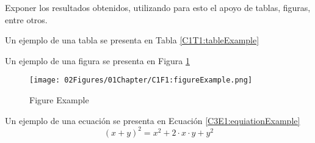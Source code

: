 Exponer los resultados obtenidos, utilizando para esto el apoyo de tablas, figuras, entre otros.

Un ejemplo de una tabla se presenta en Tabla \ref{C1T1:tableExample}


Un ejemplo de una figura se presenta en Figura \ref{C1F1:figureExample}
\begin{figure}[H]
    \centering
    \texttt{[image: 02Figures/01Chapter/C1F1:figureExample.png]}
    \caption{Figure Example}
    \label{C1F1:figureExample}
\end{figure}

Un ejemplo de una ecuación se presenta en Ecuación \ref{C3E1:equiationExample}
\begin{equation}\label{C3E1:equiationExample}
    (x+y)^2 = x^2 + 2 \cdot x \cdot y + y^2
\end{equation}
    